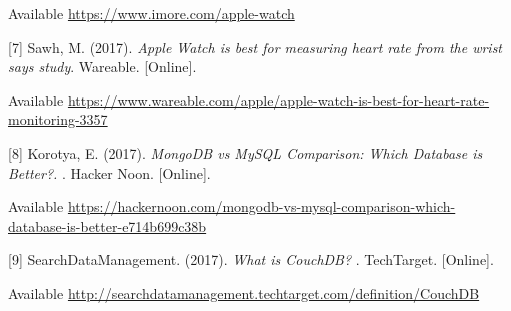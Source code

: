 \documentclass[onecolumn, draftclsnofoot,10pt, compsoc]{IEEEtran}
\begin{document}
Available \url{https://www.imore.com/apple-watch}


[7]	Sawh, M. (2017).  \textit{Apple Watch is best for measuring heart rate from the wrist says study}. Wareable. [Online]. 

Available \url{https://www.wareable.com/apple/apple-watch-is-best-for-heart-rate-monitoring-3357}


[8]	Korotya, E. (2017).  \textit{MongoDB vs MySQL Comparison: Which Database is Better?. }. Hacker Noon. [Online]. 

Available \url{https://hackernoon.com/mongodb-vs-mysql-comparison-which-database-is-better-e714b699c38b}


[9]	SearchDataManagement. (2017). \textit{What is CouchDB? }. TechTarget. [Online]. 

Available \url{http://searchdatamanagement.techtarget.com/definition/CouchDB}
\end{document}
